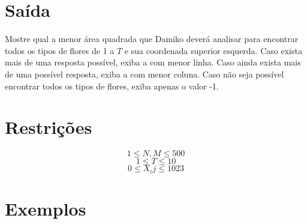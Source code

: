 \section*{Saída}

Mostre qual a menor área quadrada que Damiko deverá analisar para encontrar todos os tipos de flores de 1 a $T$ e sua coordenada superior esquerda. Caso exista mais de uma resposta possível, exiba a com menor linha. Caso ainda exista mais de uma possível resposta, exiba a com menor coluna. Caso não seja possível encontrar todos os tipos de flores, exiba apenas o valor -1.

\section*{Restrições}
$$1 \leq N,M \leq 500$$
$$1 \leq T \leq 10$$
$$0 \leq X_ij \leq 1023$$

\section*{Exemplos}
\exemplo
